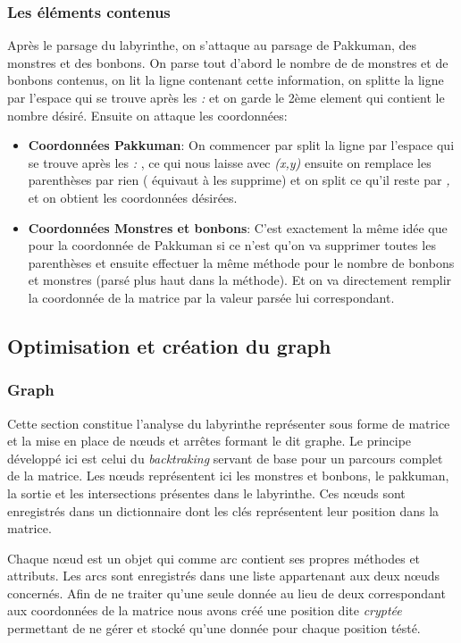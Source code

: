 \documentclass[12pt, oneside]{article}
\begin{document}
\subsubsection{Les éléments contenus}
Après le parsage du labyrinthe, on s'attaque au parsage de Pakkuman, des monstres et des bonbons.
On parse tout d'abord le nombre de de monstres et de bonbons contenus, on lit la ligne contenant cette information, on splitte la ligne par l'espace qui se trouve après les \emph{:} et on garde le 2ème element qui contient le nombre désiré.
Ensuite on attaque les coordonnées:

\begin{itemize}
\item 
\textbf{Coordonnées Pakkuman}: On commencer par split la ligne par l'espace qui se trouve après les \emph{:} , ce qui nous laisse avec \emph{(x,y)} ensuite on remplace les parenthèses par rien ( équivaut à les supprime) et on split ce qu'il reste par \emph{,} et on obtient les coordonnées désirées.
\item
\textbf{Coordonnées Monstres et bonbons}: C'est exactement la même idée que pour la coordonnée de Pakkuman si ce n'est qu'on va supprimer toutes les parenthèses et ensuite effectuer la même méthode pour le nombre de bonbons et monstres (parsé plus haut dans la méthode).
Et on va directement remplir la coordonnée de la matrice par la valeur parsée lui correspondant.

\end{itemize}

\subsection{Optimisation et création du graph}
\subsubsection{Graph}
Cette section constitue l’analyse du labyrinthe représenter sous forme de matrice et la mise en place de nœuds et arrêtes formant le dit graphe.
Le principe développé ici est celui du \emph{backtraking}  servant de base pour un parcours complet de la matrice. Les nœuds représentent ici les monstres et bonbons, le pakkuman, la sortie et les intersections présentes dans le labyrinthe. Ces nœuds sont enregistrés dans un dictionnaire dont les clés représentent leur position dans la matrice.

Chaque nœud est un objet qui comme arc contient ses propres méthodes et attributs. Les arcs sont enregistrés dans une liste appartenant aux deux nœuds concernés. 
Afin de ne traiter qu’une seule donnée au lieu de deux correspondant aux coordonnées de la matrice nous avons créé une position dite \emph{cryptée} permettant de ne gérer et stocké qu’une donnée pour chaque position tésté.
\end{document}
